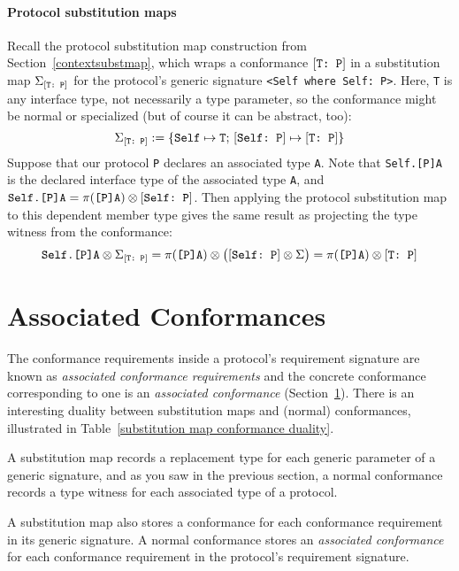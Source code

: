 \documentclass[../generics]{subfiles}
\begin{document}
\paragraph{Protocol substitution maps} Recall the protocol substitution map construction from Section~\ref{contextsubstmap}, which wraps a conformance $[\texttt{T:~P}]$ in a substitution map $\Sigma_{[\texttt{T:~P}]}$ for the protocol's generic signature \verb|<Self where Self: P>|. Here, \texttt{T} is any interface type, not necessarily a type parameter, so the conformance might be normal or specialized (but of course it can be abstract, too):
\[\Sigma_{[\texttt{T:~P}]} := \{
\texttt{Self} \mapsto \texttt{T}
;\,
[\texttt{Self:~P}] \mapsto [\texttt{T:~P}]
\}\]
Suppose that our protocol \texttt{P} declares an associated type \texttt{A}. Note that \texttt{Self.[P]A} is the declared interface type of the associated type \texttt{A}, and $\texttt{Self.[P]A}=\pi(\texttt{[P]A})\otimes[\texttt{Self:~P}]$. Then applying the protocol substitution map to this dependent member type gives the same result as projecting the type witness from the conformance:
\[\texttt{Self.[P]A}\otimes\Sigma_{[\texttt{T:~P}]}=\pi(\texttt{[P]A})\otimes\bigl([\texttt{Self:~P}]\otimes\Sigma\bigr)=\pi(\texttt{[P]A})\otimes[\texttt{T:~P}]\]

\section{Associated Conformances}\label{associated conformances}
The conformance requirements inside a protocol's requirement signature are known as \emph{associated conformance requirements} and the concrete conformance corresponding to one is an \emph{associated conformance} (Section~\ref{associated conformances}). There is an interesting duality between substitution maps and (normal) conformances, illustrated in Table~\ref{substitution map conformance duality}.

A substitution map records a replacement type for each generic parameter of a generic signature, and as you saw in the previous section, a normal conformance records a type witness for each associated type of a protocol.

A substitution map also stores a conformance for each conformance requirement in its generic signature. A normal conformance stores an \emph{associated conformance} for each conformance requirement in the protocol's requirement signature.
\end{document}
